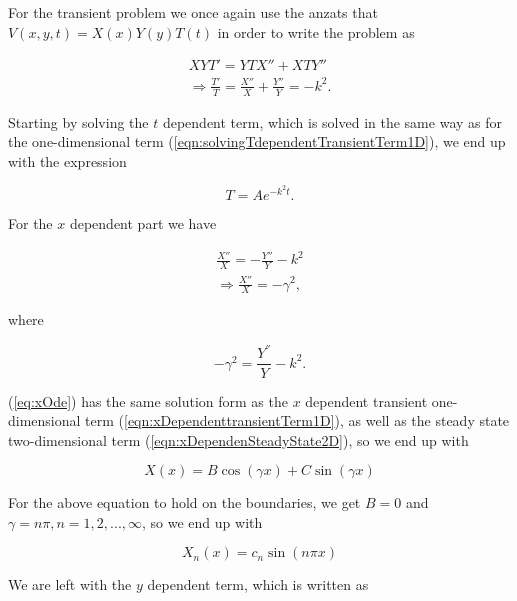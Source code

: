 \documentclass{article}
\begin{document}
For the transient problem we once again use the anzats that $V(x,y,t) = X(x)Y(y)T(t)$ in order to write the problem as

\begin{subequations}
	\begin{eqnarray}
	XYT' = YTX'' + XTY'' \\
	\Rightarrow \frac{T'}{T} = \frac{X''}{X} + \frac{Y''}{Y} = -k^2.
	\end{eqnarray}
\end{subequations}

Starting by solving the $t$ dependent term, which is solved in the same way as for the one-dimensional term (\ref{eqn:solvingTdependentTransientTerm1D}), we end up with the expression

\begin{equation}
T=Ae^{-k^2t}.
\label{eqn:2DtransientTdependentGeneralTerm}
\end{equation}

For the $x$ dependent part we have 

\begin{subequations}
	\begin{eqnarray}\label{eq:xOde}
	\frac{X''}{X} = -\frac{Y''}{Y} - k^2\\
	\Rightarrow \frac{X''}{X} = -\gamma^2,
	\end{eqnarray}
\end{subequations}

where 

\begin{equation}\label{eq:gamma}
	-\gamma^2 = \frac{Y^{''}}{Y} - k^2.
\end{equation}

(\ref{eq:xOde}) has the same solution form as the $x$ dependent transient one-dimensional term (\ref{eqn:xDependenttransientTerm1D}), as well as the steady state two-dimensional term (\ref{eqn:xDependenSteadyState2D}), so we end up with 

\begin{equation}
X(x) = B\cos(\gamma x) + C\sin(\gamma x)
\end{equation}

For the above equation to hold on the boundaries, we get  $B=0$ and $\gamma = n\pi, n=1,2,...,\infty$, so we end up with

\begin{equation}
X_n(x) = c_n\sin(n\pi x)
\label{eqn:2DtransientXdependentTerm}
\end{equation}

We are left with the $y$ dependent term, which is written as 
\end{document}
